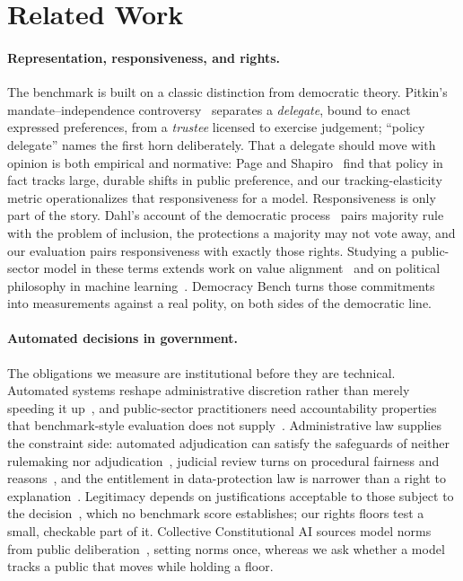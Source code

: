 \documentclass[letterpaper]{article} %
\begin{document}
\section{Related Work}\label{sec:related}

\paragraph{Representation, responsiveness, and rights.}
The benchmark is built on a classic distinction from democratic theory.
 Pitkin's
mandate--independence controversy~\cite{pitkin} separates a \emph{delegate}, bound to
enact expressed preferences, from a \emph{trustee} licensed to exercise judgement;
``policy delegate'' names the first horn deliberately. That a delegate should move with
opinion is both empirical and normative: Page and Shapiro~\cite{pageshapiro} find that
policy in fact tracks large, durable shifts in public preference, and our
tracking-elasticity metric operationalizes that responsiveness for a model.
Responsiveness is only part of the story. Dahl's account of the democratic
process~\cite{dahl} pairs majority rule with the problem of inclusion, the protections a
majority may not vote away, and our evaluation pairs responsiveness with exactly those
rights. Studying a public-sector model in these terms extends work on value
alignment~\cite{bostrom,soares,amodei} and on political philosophy in machine
learning~\cite{binns}. Democracy Bench turns those commitments into measurements against
a real polity, on both sides of the democratic line.


\paragraph{Automated decisions in government.}
The obligations we measure are institutional before they are technical. Automated
systems reshape administrative discretion rather than merely speeding it
up~\cite{bullock}, and public-sector practitioners need accountability properties that
benchmark-style evaluation does not supply~\cite{veale}. Administrative law supplies the
constraint side: automated adjudication can satisfy the safeguards of neither rulemaking
nor adjudication~\cite{citron}, judicial review turns on procedural fairness and
reasons~\cite{cobbe}, and the entitlement in data-protection law is narrower than a
right to explanation~\cite{wachter}. Legitimacy depends on justifications acceptable to
those subject to the decision~\cite{binnsreason}, which no benchmark score establishes;
our rights floors test a small, checkable part of it. Collective Constitutional AI
sources model norms from public deliberation~\cite{collectiveconstitutional}, setting
norms once, whereas we ask whether a model tracks a public that moves while holding a
floor.
\end{document}
